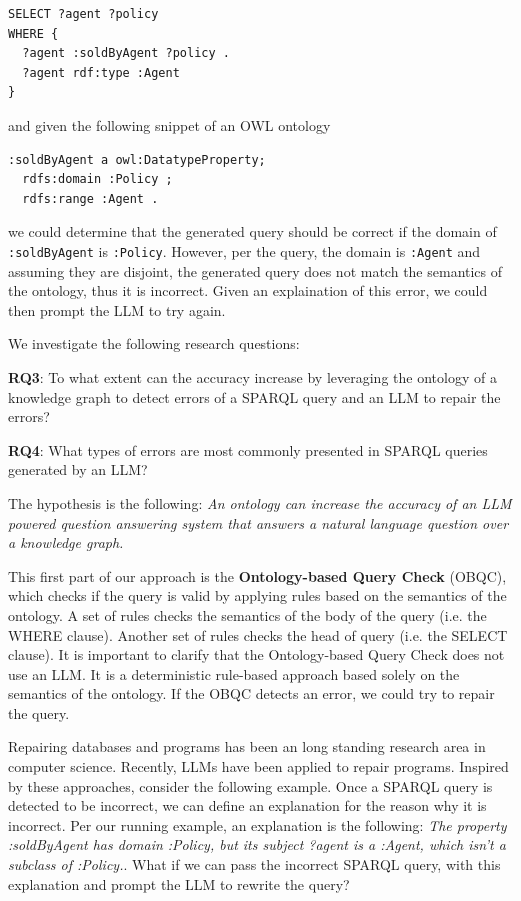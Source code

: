 \documentclass[11pt]{article}
\begin{document}
\begin{verbatim}
SELECT ?agent ?policy
WHERE {
  ?agent :soldByAgent ?policy . 
  ?agent rdf:type :Agent 
}
\end{verbatim}

\noindent and given the following snippet of an OWL ontology

\begin{verbatim}
:soldByAgent a owl:DatatypeProperty;
  rdfs:domain :Policy ;
  rdfs:range :Agent .
\end{verbatim}

\noindent we could determine that the generated query should be correct if the domain of \texttt{:soldByAgent} is \texttt{:Policy}.
However, per the query, the domain is \texttt{:Agent} and assuming they are disjoint, the generated query does not match the semantics of the ontology, thus it is incorrect. 
Given an explaination of this error, we could then prompt the LLM to try again.

We investigate the following research questions:

\noindent \textbf{RQ3}: To what extent can the accuracy increase by leveraging the ontology of a knowledge graph to detect errors of a SPARQL query and an LLM to repair the errors?
    
\noindent \textbf{RQ4}: What types of errors are most commonly presented in SPARQL queries generated by an LLM?

The hypothesis is the following: \textit{An ontology can increase the accuracy of an LLM powered question answering system that answers a natural language question over a knowledge graph.}

This first part of our approach is the \textbf{Ontology-based Query Check} (OBQC), which checks if the query is valid by applying rules based on the semantics of the ontology. 
A set of rules checks the semantics of the body of the query (i.e. the WHERE clause).
Another set of rules checks the head of query (i.e. the SELECT clause). 
It is important to clarify that the Ontology-based Query Check does not use an LLM. 
It is a deterministic rule-based approach based solely on the semantics of the ontology. 
If the OBQC detects an error, we could try to repair the query.

Repairing databases\cite{10.1145/1514894.1514899} and programs\cite{10.1145/3318162,10.1145/3631974} has been an long standing research area in computer science. 
Recently, LLMs have been applied to repair programs\cite{bouzenia2024repairagent, 10.1145/3611643.3613892}.
Inspired by these approaches, consider the following example. 
Once a SPARQL query is detected to be incorrect, we can define an explanation for the reason why it is incorrect. 
Per our running example, an explanation is the following: \textit{The property
:soldByAgent has domain :Policy, but its subject ?agent is a :Agent, which isn’t a subclass of :Policy.}.
What if we can pass the incorrect SPARQL query, with this explanation and prompt the LLM to rewrite the query? 
\end{document}
